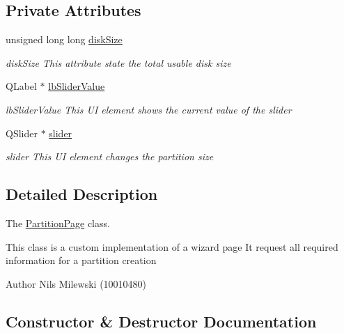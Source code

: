 \subsection*{Private Attributes}
\begin{DoxyCompactItemize}
\item 
\mbox{\label{class_partition_page_ad564ff04040e97b842785ba79c1ca2fe}} 
unsigned long long \mbox{\hyperlink{class_partition_page_ad564ff04040e97b842785ba79c1ca2fe}{disk\+Size}}
\begin{DoxyCompactList}\small\item\em disk\+Size This attribute state the total usable disk size \end{DoxyCompactList}\item 
\mbox{\label{class_partition_page_a43cc085a7c6fe43bc4dd5bf3dfab73a7}} 
Q\+Label $\ast$ \mbox{\hyperlink{class_partition_page_a43cc085a7c6fe43bc4dd5bf3dfab73a7}{lb\+Slider\+Value}}
\begin{DoxyCompactList}\small\item\em lb\+Slider\+Value This UI element shows the current value of the slider \end{DoxyCompactList}\item 
\mbox{\label{class_partition_page_aff6a3942a73b05da887ab96010b71f43}} 
Q\+Slider $\ast$ \mbox{\hyperlink{class_partition_page_aff6a3942a73b05da887ab96010b71f43}{slider}}
\begin{DoxyCompactList}\small\item\em slider This UI element changes the partition size \end{DoxyCompactList}\end{DoxyCompactItemize}


\subsection{Detailed Description}
The \mbox{\hyperlink{class_partition_page}{Partition\+Page}} class. 

This class is a custom implementation of a wizard page It request all required information for a partition creation \begin{DoxyAuthor}{Author}
Nils Milewski (10010480) 
\end{DoxyAuthor}


\subsection{Constructor \& Destructor Documentation}
\mbox{\label{class_partition_page_a0d12fa168dd41719b3d70cb2effd3629}} 
